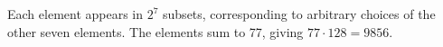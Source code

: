 Each element appears in $2^7$ subsets, corresponding to arbitrary choices of the other seven elements. The elements sum to 77, giving $77\cdot128=\boxed{9856}$.

